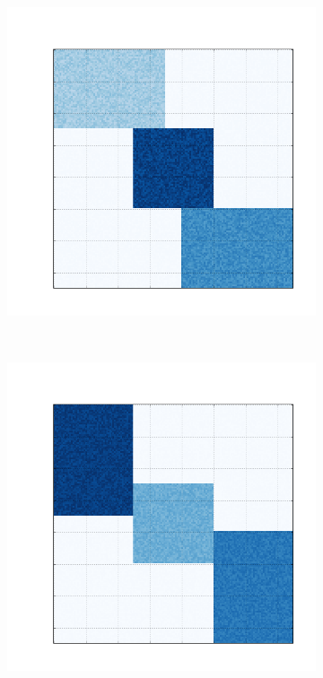 \documentclass[
    12pt,                %
    oneside,            %
    a4paper,            %
    english,            %
    brazil                %
    ]{abntex2ppgsi}
\begin{document}
\begin{figure} [htpb]
\begin{subfigure}[b]{0.18\textwidth}
        \caption{}
        \label{fig:bic-syntetic-structure:c}
    \end{subfigure}
    ~
    \begin{subfigure}[b]{0.18\textwidth}
        \includegraphics[width=\textwidth]{img/d-bic-structure.png}
        \caption{}
        \label{fig:bic-syntetic-structure:d}
    \end{subfigure}
    ~
    \begin{subfigure}[b]{0.18\textwidth}
        \includegraphics[width=\textwidth]{img/e-bic-structure.png}
        \caption{}
        \label{fig:bic-syntetic-structure:e}
    \end{subfigure}
    \label{fig:bic-syntetic-structure}
\end{figure}
\end{document}
